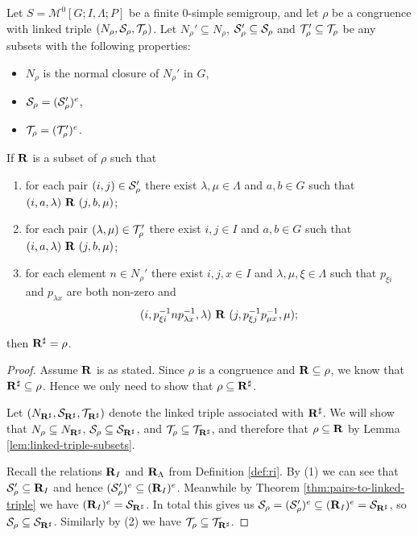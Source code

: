 \begin{theorem}
  \label{thm:linked-triple-to-pairs}
  Let $S = \mathcal{M}^0[G;I,\Lambda;P]$ be a finite 0-simple semigroup, and let
  $\rho$ be a congruence with linked triple $(N_\rho, \mathcal{S}_\rho, \mathcal{T}_\rho)$.  Let
  $N_\rho' \subseteq N_\rho$, $\mathcal{S}_\rho' \subseteq \mathcal{S}_\rho$ and
  $\mathcal{T}_\rho' \subseteq \mathcal{T}_\rho$ be any subsets with the following properties:
  \begin{itemize}
  \item $N_\rho$ is the normal closure of $N_\rho'$ in $G$,
  \item $\mathcal{S}_\rho = (\mathcal{S}_\rho')^e$,
  \item $\mathcal{T}_\rho = (\mathcal{T}_\rho')^e$.
  \end{itemize}
  If $\mathbf{R}$ is a subset of $\rho$ such that
  \begin{enumerate}[\rm(1)]
  \item for each pair $(i, j) \in \mathcal{S}_\rho'$ there exist $\lambda, \mu \in \Lambda$
    and $a, b \in G$ such that $(i, a, \lambda) ~\mathbf{R}~ (j, b, \mu)$;
  \item for each pair $(\lambda, \mu) \in \mathcal{T}_\rho'$ there exist $i, j \in I$ and
    $a, b \in G$ such that $(i, a, \lambda) ~\mathbf{R}~ (j, b, \mu)$;
  \item for each element $n \in N_\rho'$ there exist $i,j,x \in I$ and $\lambda,
    \mu, \xi \in \Lambda$ such that $p_{\xi i}$ and $p_{\lambda x}$ are both
    non-zero and
    $$(i, p_{\xi i}^{-1} n p_{\lambda x}^{-1}, \lambda) ~\mathbf{R}~
    (j, p_{\xi j}^{-1} p_{\mu x}^{-1}, \mu);$$
  \end{enumerate}
  then $\mathbf{R}^\sharp = \rho$.

  \begin{proof}
    Assume $\mathbf{R}$ is as stated.  Since $\rho$ is a congruence and
    $\mathbf{R} \subseteq \rho$, we know that $\mathbf{R}^\sharp \subseteq \rho$.  Hence we only
    need to show that $\rho \subseteq \mathbf{R}^\sharp$.

    Let $(N_{\mathbf{R}^\sharp}, \mathcal{S}_{\mathbf{R}^\sharp}, \mathcal{T}_{\mathbf{R}^\sharp})$ denote the linked triple associated with
    $\mathbf{R}^\sharp$.  We will show that $N_\rho \subseteq N_{\mathbf{R}^\sharp}$,
    $\mathcal{S}_\rho \subseteq \mathcal{S}_{\mathbf{R}^\sharp}$, and $\mathcal{T}_\rho \subseteq \mathcal{T}_{\mathbf{R}^\sharp}$, and therefore
    that $\rho \subseteq \mathbf{R}$ by Lemma \ref{lem:linked-triple-subsets}.

    Recall the relations $\mathbf{R}_I$ and $\mathbf{R}_\Lambda$ from Definition \ref{def:ri}.
    By (1) we can see that $\mathcal{S}_\rho' \subseteq \mathbf{R}_I$ and hence
    $(\mathcal{S}_\rho')^e \subseteq (\mathbf{R}_I)^e$.  Meanwhile by Theorem
    \ref{thm:pairs-to-linked-triple} we have $(\mathbf{R}_I)^e = \mathcal{S}_{\mathbf{R}^\sharp}$.  In
    total this gives us
    $\mathcal{S}_\rho = (\mathcal{S}_\rho')^e \subseteq (\mathbf{R}_I)^e = \mathcal{S}_{\mathbf{R}^\sharp}$, so
    $\mathcal{S}_\rho \subseteq \mathcal{S}_{\mathbf{R}^\sharp}$.  Similarly by (2) we have
    $\mathcal{T}_\rho \subseteq \mathcal{T}_{\mathbf{R}^\sharp}$.


\end{proof}
\end{theorem}
